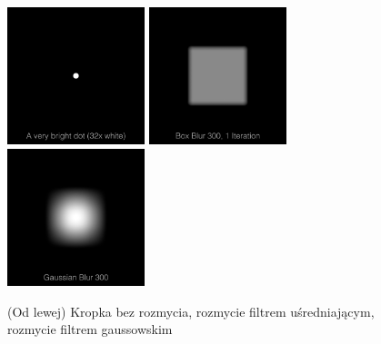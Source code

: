 \documentclass[a4paper,12pt]{book}
\begin{document}
			\begin{figure}[H]
				\caption{(Od lewej) Kropka bez rozmycia, rozmycie filtrem uśredniającym, rozmycie filtrem gaussowskim}
				\includegraphics[width=4cm, height=4cm]{overview/gauss-dot.jpg}
				\includegraphics[width=4cm, height=4cm]{overview/gauss-dot-boxblur.jpg}
				\includegraphics[width=4cm, height=4cm]{overview/gauss-dot-gaussianblur.jpg}
			\end{figure}
\end{document}
